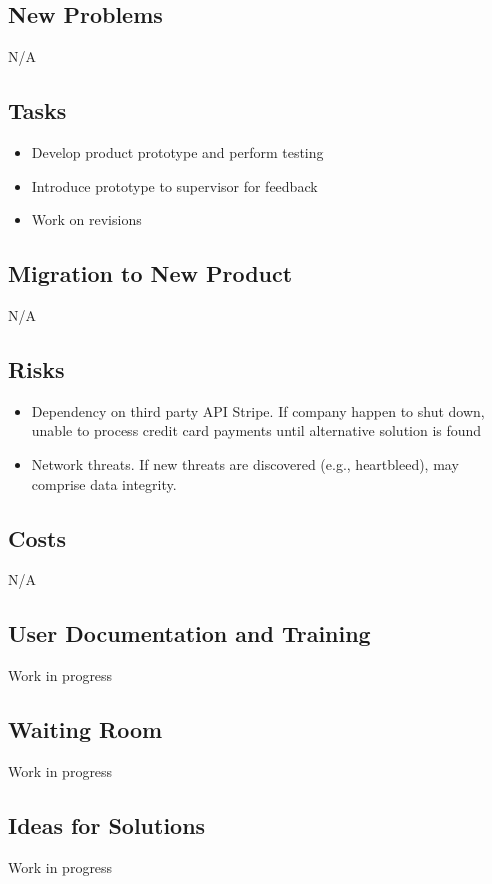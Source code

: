 \documentclass[12pt, titlepage]{article}
\begin{document}
\subsection{New Problems}
N/A
\subsection{Tasks}
\begin{itemize}
  \item Develop product prototype and perform testing 
  \item Introduce prototype to supervisor for feedback
  \item 	Work on revisions
\end{itemize}
\subsection{Migration to New Product}
N/A
\subsection{Risks}
\begin{itemize}
  \item Dependency on third party API Stripe. If company happen to shut down, unable to process credit card payments until alternative solution is found
  \item Network threats. If new threats are discovered (e.g., heartbleed), may comprise data integrity. 
\end{itemize}
\subsection{Costs}
N/A
\subsection{User Documentation and Training}
Work in progress
\subsection{Waiting Room}
Work in progress
\subsection{Ideas for Solutions}
Work in progress
\end{document}

